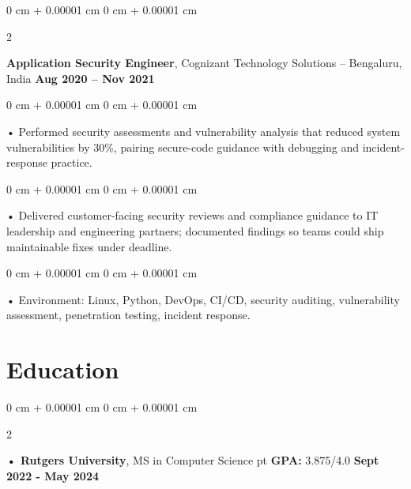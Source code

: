 \documentclass[10pt, letterpaper]{article}
\newenvironment{onecolentry}{
    \begin{adjustwidth}{
        0 cm + 0.00001 cm
    }{
        0 cm + 0.00001 cm
    }
}{
    \end{adjustwidth}
} %
\newenvironment{twocolentry}[2][]{
    \onecolentry
    \def\secondColumn{#2}
    \setcolumnwidth{\fill, 4.5 cm}
    \begin{paracol}{2}
}{
    \switchcolumn \raggedleft \secondColumn
    \end{paracol}
    \endonecolentry
} %
\begin{document}
        \begin{twocolentry}{
            \textbf{Aug 2020 – Nov 2021}
        }
            \vspace{2 pt }
            \textbf{Application Security Engineer}, Cognizant Technology Solutions -- Bengaluru, India\end{twocolentry}
        \begin{onecolentry}
             • Performed security assessments and vulnerability analysis that reduced system vulnerabilities by 30\%, pairing secure-code guidance with debugging and incident-response practice.
        \end{onecolentry}
        \begin{onecolentry}
             • Delivered customer-facing security reviews and compliance guidance to IT leadership and engineering partners; documented findings so teams could ship maintainable fixes under deadline.
        \end{onecolentry}
        \begin{onecolentry}
             • Environment: Linux, Python, DevOps, CI/CD, security auditing, vulnerability assessment, penetration testing, incident response.
        \end{onecolentry}
    \vspace{2 pt }
        \section{Education}
        \vspace{2 pt }
        \begin{twocolentry}{
            \textbf{Sept 2022 - May 2024}
        }
            \textbf{ • Rutgers University}, MS in Computer Science  pt \textbf{GPA:} 3.875/4.0  \end{twocolentry}
\end{document}
